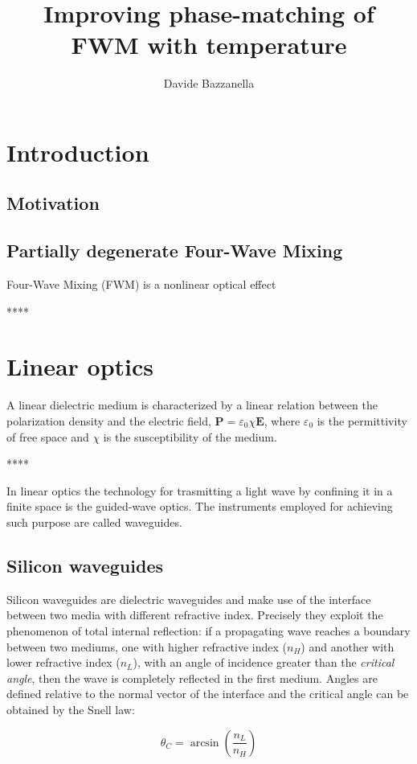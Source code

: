 \documentclass[12pt,a4paper,twocolumn,twoside]{article}
\author{Davide Bazzanella}
\title{Improving phase-matching of FWM with temperature}
\begin{document}

\cleardoublepage 
\tableofcontents

\cleardoublepage 
\section{Introduction}
\subsection{Motivation}
\subsection{Partially degenerate Four-Wave Mixing}
Four-Wave Mixing (FWM) is a nonlinear optical effect

****
\section{Linear optics}

A linear dielectric medium is characterized by a linear relation between the polarization density and the electric field, $\textbf{P} = \varepsilon_0 \chi \textbf{E}$, where $\varepsilon_0$ is the permittivity of free space and $\chi$ is the susceptibility of the medium.

****

In linear optics the technology for trasmitting a light wave by confining it in a finite space is the guided-wave optics.
The instruments employed for achieving such purpose are called waveguides.
\subsection{Silicon waveguides}
Silicon waveguides are dielectric waveguides and make use of the interface between two media with different refractive index.
Precisely they exploit the phenomenon of total internal reflection: if a propagating wave reaches a boundary between two mediums, one with higher refractive index ($n_H$) and another with lower refractive index ($n_L$), with an angle of incidence greater than the \textit{critical angle}, then the wave is completely reflected in the first medium.
Angles are defined relative to the normal vector of the interface and the critical angle can be obtained by the Snell law:

$$	\theta_C = \arcsin \left( \frac{n_L}{n_H} \right)$$
\end{document}

